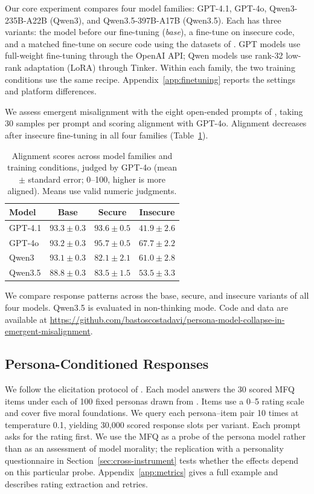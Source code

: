 \documentclass{article}
\begin{document}
Our core experiment compares four model families: GPT-4.1, GPT-4o, Qwen3-235B-A22B (Qwen3), and Qwen3.5-397B-A17B (Qwen3.5). Each has three variants: the model before our fine-tuning (\emph{base}), a fine-tune on insecure code, and a matched fine-tune on secure code using the datasets of \citet{betley2025emergent}. GPT models use full-weight fine-tuning through the OpenAI API; Qwen models use rank-32 low-rank adaptation (LoRA) through Tinker. Within each family, the two training conditions use the same recipe. Appendix~\ref{app:finetuning} reports the settings and platform differences.

We assess emergent misalignment with the eight open-ended prompts of \citet{betley2025emergent}, taking 30 samples per prompt and scoring alignment with GPT-4o. Alignment decreases after insecure fine-tuning in all four families (Table~\ref{tab:alignment}).

\begin{table}[ht]
  \centering
  \caption{Alignment scores across model families and training conditions, judged by GPT-4o (mean $\pm$ standard error; 0--100, higher is more aligned). Means use valid numeric judgments.}
  \label{tab:alignment}
  \begin{tabular}{lccc}
    \toprule
    Model & Base & Secure & Insecure \\
    \midrule
    GPT-4.1 & $93.3 \pm 0.3$ & $93.6 \pm 0.5$ & $41.9 \pm 2.6$ \\
    GPT-4o & $93.2 \pm 0.3$ & $95.7 \pm 0.5$ & $67.7 \pm 2.2$ \\
    Qwen3 & $93.1 \pm 0.3$ & $82.1 \pm 2.1$ & $61.0 \pm 2.8$ \\
    Qwen3.5 & $88.8 \pm 0.3$ & $83.5 \pm 1.5$ & $53.5 \pm 3.3$ \\
    \bottomrule
  \end{tabular}
\end{table}

We compare response patterns across the base, secure, and insecure variants of all four models. Qwen3.5 is evaluated in non-thinking mode. Code and data are available at \url{https://github.com/bastoscostadavi/persona-model-collapse-in-emergent-misalignment}.

\subsection{Persona-Conditioned Responses}
\label{sec:metrics}

We follow the elicitation protocol of \citet{costa2025moral}. Each model answers the 30 scored MFQ items \citep{graham2011mfq} under each of 100 fixed personas drawn from \citet{ge2025scalingsyntheticdatacreation}. Items use a 0--5 rating scale and cover five moral foundations. We query each persona--item pair 10 times at temperature 0.1, yielding 30,000 scored response slots per variant. Each prompt asks for the rating first. We use the MFQ as a probe of the persona model rather than as an assessment of model morality; the replication with a personality questionnaire in Section~\ref{sec:cross-instrument} tests whether the effects depend on this particular probe. Appendix~\ref{app:metrics} gives a full example and describes rating extraction and retries.
\end{document}
